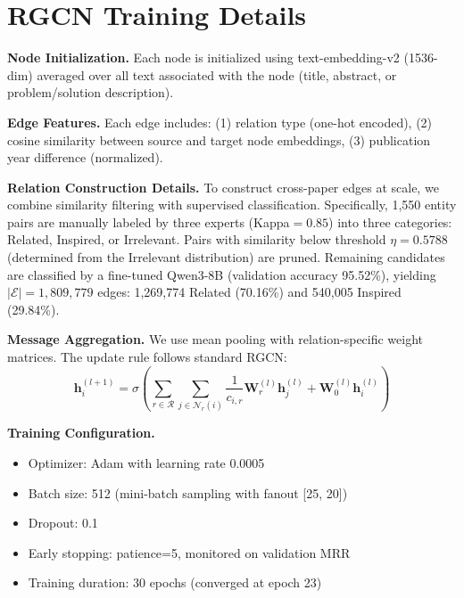 \documentclass[runningheads]{llncs}
\begin{document}





\newpage
\appendix

\section{RGCN Training Details}
\label{app:rgcn}

\textbf{Node Initialization.} Each node is initialized using text-embedding-v2 (1536-dim) averaged over all text associated with the node (title, abstract, or problem/solution description).

\textbf{Edge Features.} Each edge includes: (1) relation type (one-hot encoded), (2) cosine similarity between source and target node embeddings, (3) publication year difference (normalized).

\textbf{Relation Construction Details.} To construct cross-paper edges at scale, we combine similarity filtering with supervised classification. Specifically, 1,550 entity pairs are manually labeled by three experts (Kappa$=0.85$) into three categories: Related, Inspired, or Irrelevant. Pairs with similarity below threshold $\eta = 0.5788$ (determined from the Irrelevant distribution) are pruned. Remaining candidates are classified by a fine-tuned Qwen3-8B (validation accuracy 95.52\%), yielding $|\mathcal{E}| = 1{,}809{,}779$ edges: 1,269,774 Related (70.16\%) and 540,005 Inspired (29.84\%).


\textbf{Message Aggregation.} We use mean pooling with relation-specific weight matrices. The update rule follows standard RGCN:
\begin{equation}
\mathbf{h}_i^{(l+1)} = \sigma\left(\sum_{r\in\mathcal{R}}\sum_{j\in\mathcal{N}_r(i)}\frac{1}{c_{i,r}}\mathbf{W}_r^{(l)}\mathbf{h}_j^{(l)} + \mathbf{W}_0^{(l)}\mathbf{h}_i^{(l)}\right)
\end{equation}

\textbf{Training Configuration.} 
\begin{itemize}[leftmargin=*]
    \item Optimizer: Adam with learning rate 0.0005
    \item Batch size: 512 (mini-batch sampling with fanout [25, 20])
    \item Dropout: 0.1
    \item Early stopping: patience=5, monitored on validation MRR
    \item Training duration: 30 epochs (converged at epoch 23)
\end{itemize}
\end{document}
